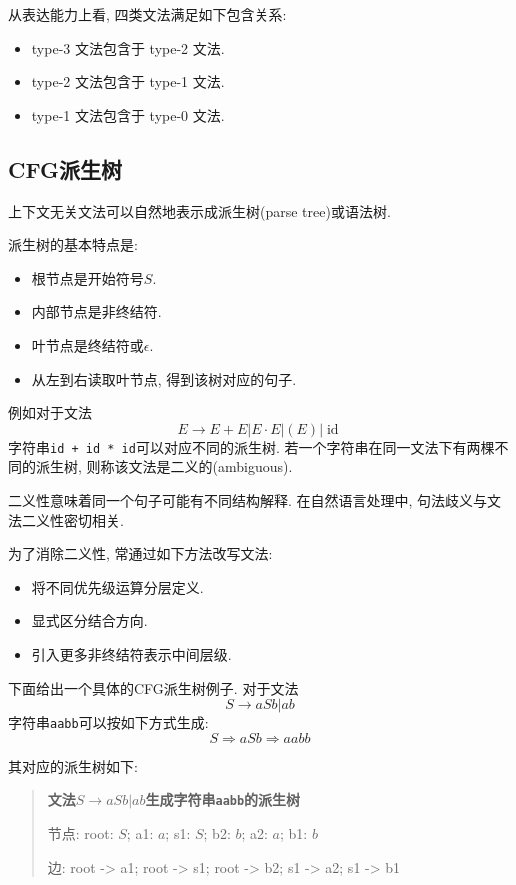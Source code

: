 从表达能力上看, 四类文法满足如下包含关系:

\begin{itemize}
\item type-3 文法包含于 type-2 文法.
\item type-2 文法包含于 type-1 文法.
\item type-1 文法包含于 type-0 文法.
\end{itemize}

\subsection{CFG派生树}


上下文无关文法可以自然地表示成派生树(parse tree)或语法树.

派生树的基本特点是:

\begin{itemize}
\item 根节点是开始符号$S$.
\item 内部节点是非终结符.
\item 叶节点是终结符或$\epsilon$.
\item 从左到右读取叶节点, 得到该树对应的句子.
\end{itemize}

例如对于文法
\[
E \to E + E | E \cdot E | (E) | \operatorname{id}
\]
字符串\texttt{id + id * id}可以对应不同的派生树.
若一个字符串在同一文法下有两棵不同的派生树, 则称该文法是二义的(ambiguous).

二义性意味着同一个句子可能有不同结构解释.
在自然语言处理中, 句法歧义与文法二义性密切相关.

为了消除二义性, 常通过如下方法改写文法:

\begin{itemize}
\item 将不同优先级运算分层定义.
\item 显式区分结合方向.
\item 引入更多非终结符表示中间层级.
\end{itemize}

下面给出一个具体的CFG派生树例子. 对于文法
\[
S \to a S b | a b
\]
字符串\texttt{aabb}可以按如下方式生成:
\[
S \Rightarrow a S b \Rightarrow a a b b
\]

其对应的派生树如下:

\begin{quote}
\small
\textbf{文法$S \to a S b | a b$生成字符串\texttt{aabb}的派生树}
\par 节点: root: $S$; a1: $a$; s1: $S$; b2: $b$; a2: $a$; b1: $b$
\par 边: root -\textgreater{} a1; root -\textgreater{} s1; root -\textgreater{} b2; s1 -\textgreater{} a2; s1 -\textgreater{} b1
\end{quote}

